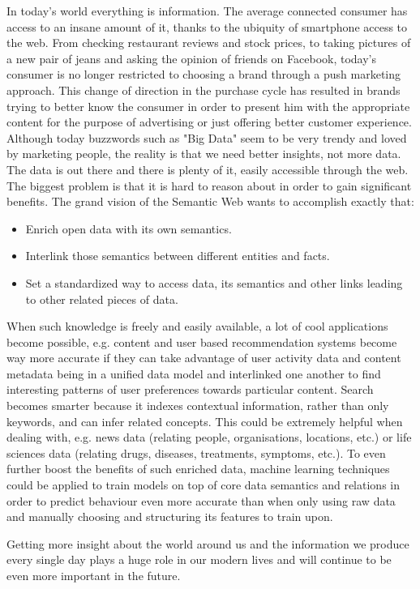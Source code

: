 In today's world everything is information. The average connected consumer has access to an insane amount of it, thanks to the ubiquity of smartphone access to the web. From checking restaurant reviews and stock prices, to taking pictures of a new pair of jeans and asking the opinion of friends on Facebook, today's consumer is no longer restricted to choosing a brand through a push marketing approach. This change of direction in the purchase cycle has resulted in brands trying to better know the consumer in order to present him with the appropriate content for the purpose of advertising or just offering better customer experience. Although today buzzwords such as "Big Data" seem to be very trendy and loved by marketing people, the reality is that we need better insights, not more data. The data is out there and there is plenty of it, easily accessible through the web. The biggest problem is that it is hard to reason about in order to gain significant benefits. The grand vision of the Semantic Web wants to accomplish exactly that:
\begin{itemize}
    \item Enrich open data with its own semantics.
    \item Interlink those semantics between different entities and facts.
    \item Set a standardized way to access data, its semantics and other links leading to other related pieces of data.
\end{itemize}
When such knowledge is freely and easily available, a lot of cool applications become possible, e.g. content and user based recommendation systems become way more accurate if they can take advantage of user activity data and content metadata being in a unified data model and interlinked one another to find interesting patterns of user preferences towards particular content. Search becomes smarter because it indexes contextual information, rather than only keywords, and can infer related concepts. This could be extremely helpful when dealing with, e.g. news data (relating people, organisations, locations, etc.) or life sciences data (relating drugs, diseases, treatments, symptoms, etc.). To even further boost the benefits of such enriched data, machine learning techniques could be applied to train models on top of core data semantics and relations in order to predict behaviour even more accurate than when only using raw data and manually choosing and structuring its features to train upon. 

Getting more insight about the world around us and the information we produce every single day plays a huge role in our modern lives and will continue to be even more important in the future.

